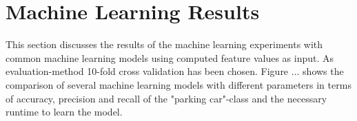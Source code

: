 \section{Machine Learning Results}
\label{sec:machine_learning_results}

This section discusses the results of the machine learning experiments with common machine learning models using computed feature values as input. As evaluation-method 10-fold cross validation has been chosen. Figure ... shows the comparison of several machine learning models with different parameters in terms of accuracy, precision and recall of the "parking car"-class and the necessary runtime to learn the model.


\begin{table}



\caption{Results of classic machine learning models applied on the full and filtered dataset.}
\label{table:classic_ml_results}
\end{table}


